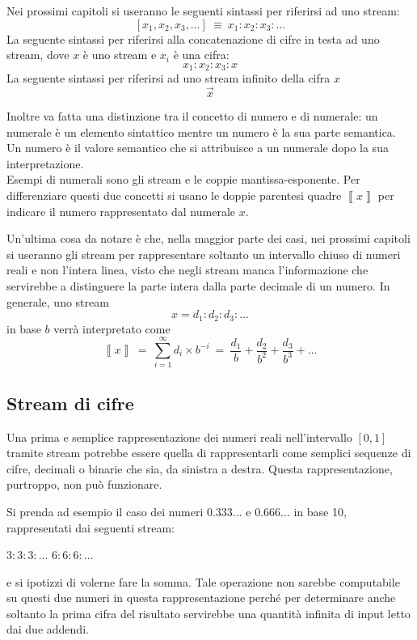 \documentclass[Lau]{sapthesis}
\begin{document}
\medskip

Nei prossimi capitoli si useranno le seguenti sintassi per riferirsi ad uno 
stream:
$$\left[x_1, x_2, x_3,\ldots\right]\ \equiv\ x_1:x_2:x_3:\ldots$$
La seguente sintassi per riferirsi alla concatenazione di cifre in testa ad uno 
stream, dove $x$ è uno stream e $x_i$ è una cifra:
$$x_1:x_2:x_3:x$$
La seguente sintassi per riferirsi ad uno stream infinito della cifra $x$
$$\overrightarrow{x}$$

Inoltre va fatta una distinzione tra il concetto di numero e di numerale: un numerale è un elemento sintattico mentre un numero è la sua parte semantica. Un numero è il valore semantico che si attribuisce a un numerale dopo la sua interpretazione.\\
Esempi di numerali sono gli stream e le coppie mantissa-esponente. Per differenziare questi due concetti si usano le doppie parentesi quadre 
$\left\llbracket x\right\rrbracket$ per indicare il numero rappresentato dal 
numerale 
$x$.

Un'ultima cosa da notare è che, nella maggior parte dei casi, nei prossimi 
capitoli si useranno gli stream per rappresentare soltanto un intervallo chiuso 
di numeri reali e non l'intera linea, visto che negli stream manca 
l'informazione che servirebbe a distinguere la parte intera dalla parte decimale 
di un numero. In generale, uno stream
$$x=d_1:d_2:d_3:\ldots$$
in base $b$ verrà interpretato come
$$\left\llbracket x\right\rrbracket\ =\ \sum_{i=1}^{\infty} d_i \times b^{-i}\ =\ 
\frac{d_1}{b}+\frac{d_2}{b^2}+\frac{d_3}{b^3}+\ldots$$


\subsection{Stream di cifre}
Una prima e semplice rappresentazione dei numeri reali nell'intervallo $\left[0,1 \right]$ tramite stream potrebbe 
essere quella di rappresentarli come semplici sequenze di cifre, decimali o 
binarie che sia, da sinistra a destra. Questa rappresentazione, purtroppo, non 
può funzionare.

Si prenda ad esempio il caso dei numeri $0.333\ldots$ e $0.666\ldots$ in 
base 10, rappresentati dai seguenti stream:
\begin{center}
$3:3:3:\ldots$ \hspace{1cm} $6:6:6:\ldots$
\end{center}
e si ipotizzi di volerne fare la somma. Tale operazione non sarebbe computabile su questi due numeri in questa 
rappresentazione perché per determinare anche soltanto la prima cifra del 
risultato servirebbe una quantità infinita di input letto dai due addendi.
\end{document}
